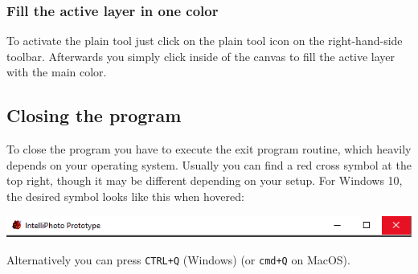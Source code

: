 \documentclass[a4paper, 12pt]{article}
\begin{document}
\subsubsection{Fill the active layer in one color}
To activate the plain tool just click on the plain tool icon on the right-hand-side toolbar.
Afterwards you simply click inside of the canvas to fill the active layer with the main color.

\subsection{Closing the program}
To close the program you have to execute the exit program routine, which heavily depends on your operating system. Usually you can find a red cross symbol at the top right, though it may be different depending on your setup.
For Windows 10, the desired symbol looks like this when hovered:
\begin{center}
\includegraphics[width=0.9\linewidth,keepaspectratio]{assets/close-window}
\end{center}
Alternatively you can press \texttt{CTRL+Q} (Windows) (or \texttt{cmd+Q} on MacOS).
\end{document}

